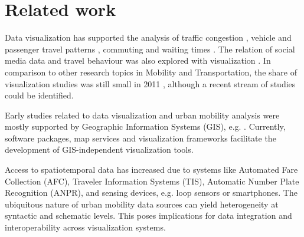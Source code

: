 \documentclass[]{interact}
\theoremstyle{plain}%
\theoremstyle{definition}
\theoremstyle{remark}
\theoremstyle{definition}
\begin{document}
\section{Related work}
\label{sec:relatedwork}

Data visualization has supported the analysis of traffic congestion \citep{Cheng2013,Wang2013}, vehicle and passenger travel patterns \citep{Mao2016,Lu2016,Andrienko2016a,Chen2016,Huang2016,VonLandesberger2016}, commuting and waiting times \citep{Zeng2014}. The relation of social media data and travel behaviour was also explored with visualization \citep{Wu2012}. In comparison to other research topics in Mobility and Transportation, the share of visualization studies was still small in 2011 \citep{Zhang2011}, although a recent stream of studies could be identified.

Early studies related to data visualization and urban mobility analysis were mostly supported by Geographic Information Systems (GIS), e.g. \citep{Yu2006a,Wang2005a}. Currently, software packages, map services and visualization frameworks facilitate the development of GIS-independent visualization tools.

Access to spatiotemporal data has increased due to systems like Automated Fare Collection (AFC), Traveler Information Systems (TIS), Automatic Number Plate Recognition (ANPR), and sensing devices, e.g. loop sensors or smartphones. The ubiquitous nature of urban mobility data sources can yield heterogeneity at syntactic and schematic levels. This poses implications for data integration and interoperability across visualization systems.

\end{document}

